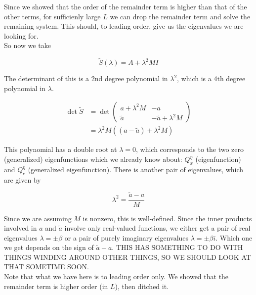 \documentclass[12pt]{article}
\begin{document}
Since we showed that the order of the remainder term is higher than that of the other terms, for sufficienly large $L$ we can drop the remainder term and solve the remaining system. This should, to leading order, give us the eigenvalues we are looking for.\\

So now we take

\[
\tilde{S}(\lambda) = A + \lambda^2 MI
\]

The determinant of this is a 2nd degree polynomial in $\lambda^2$, which is a 4th degree polynomial in $\lambda$.

\begin{align*}
\det \tilde{S} &= \det \begin{pmatrix}
a + \lambda^2 M & -a \\ \tilde{a} & -\tilde{a} + \lambda^2 M 
\end{pmatrix} \\
&= \lambda^2 M ( (a - \tilde{a}) + \lambda^2 M)
\end{align*}

This polynomial has a double root at $\lambda = 0$, which corresponds to the two zero (generalized) eigenfunctions which we already know about: $Q^\eta_x$ (eigenfunction) and $Q^\eta_c$ (generalized eigenfunction). There is another pair of eigenvalues, which are given by

\[
\lambda^2 = \frac{\tilde{a} - a}{M}
\]

Since we are assuming $M$ is nonzero, this is well-defined. Since the inner products involved in $a$ and $\tilde{a}$ involve only real-valued functions, we either get a pair of real eigenvalues $\lambda = \pm \beta$ or a pair of purely imaginary eigenvalues $\lambda = \pm \beta i$. Which one we get depends on the sign of $\tilde{a} - a$. THIS HAS SOMETHING TO DO WITH THINGS WINDING AROUND OTHER THINGS, SO WE SHOULD LOOK AT THAT SOMETIME SOON.\\

Note that what we have here is to leading order only. We showed that the remainder term is higher order (in $L$), then ditched it.
\end{document}
